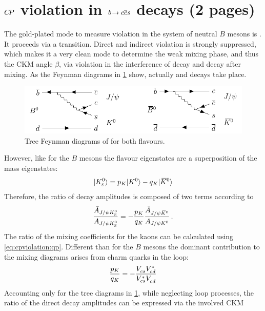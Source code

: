 
\section{\texorpdfstring{${C\!P}$}{CP} violation in \texorpdfstring{${b}\!\rightarrow {\ensuremath{c}}{\ensuremath{\overline {{c}}}}{\ensuremath{s}}$}{bToccbars} decays (2 pages)}
\label{sec:cpviolation:btoccbars}

The gold-plated mode to measure \CP violation in the system of neutral $B$
mesons is \BdToJPsiKS. It proceeds via a \bToccbars transition. Direct and
indirect \CP violation is strongly suppressed, which makes it a very clean
mode to determine the weak mixing phase, and thus the CKM angle $\beta$, via
\CP violation in the interference of decay and decay after mixing. As the
Feynman diagrams in \cref{fig:cpviolation:bd2jpsiks_feynmans} show, actually
\BdToJPsiKz and \BdbToJPsiKzb decays take place.
\begin{figure}[htb]
\centering
\includegraphics[width=\textwidth]{03-CPViolation/tikz/pdf/BdToJPsiKS_Feynmans.pdf}
\caption{Tree Feynman diagrams of \BdToJPsiKS for both flavours.}
\label{fig:cpviolation:bd2jpsiks_feynmans}
\end{figure}
However, like for the $B$ mesons the flavour eigenstates are a superposition
of the \CP mass eigenstates:
\begin{align}
	|{{K}^0_{\mathrm{ \scriptscriptstyle S}}}\rangle = p_K |{{K}^0}\rangle - q_K |{{\kern 0.2em\overline{\kern -0.2em K}{}}{}^0}\rangle
\end{align}
Therefore, the ratio of decay amplitudes is composed of two terms according to
\begin{align}
	\frac{\bar{A}_{J/\psi{\ensuremath{{K}^0_{\mathrm{ \scriptscriptstyle S}}}}}}{A_{J/\psi{\ensuremath{{K}^0_{\mathrm{ \scriptscriptstyle S}}}}}} = -\frac{p_K}{q_K}\frac{\bar{A}_{J/\psi{\ensuremath{{\kern 0.2em\overline{\kern -0.2em K}{}}{}^0}}}}{A_{J/\psi{\ensuremath{{K}^0}}}}\,.
\end{align}
The ratio of the mixing coefficients for the kaons can be calculated using
\cref{eq:cpviolation:qp}. Different than for the $B$ mesons the dominant
contribution to the mixing diagrams arises from charm quarks in the loop:
\begin{align}
	\frac{p_K}{q_K} = -\frac{{V_{{c}{s}}^{}}{V_{{c}{d}}^\ast}}{{V_{{c}{s}}^\ast}{V_{{c}{d}}^{}}}
\end{align}
Accounting only for the tree diagrams in
\cref{fig:cpviolation:bd2jpsiks_feynmans}, while neglecting loop processes,
the ratio of the direct decay amplitudes can be expressed via the involved CKM
